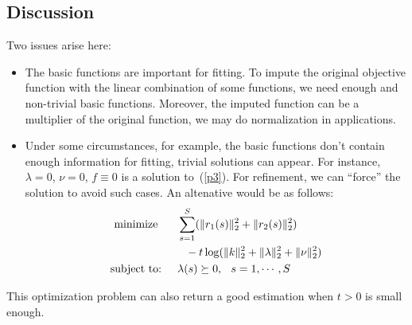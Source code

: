 \subsection{Discussion}

Two issues arise here:
\begin{itemize}
\item The basic functions are important for fitting. To impute the original objective function with the linear combination of some functions, we need enough and non-trivial basic functions. Moreover, the imputed function can be a multiplier of the original function, we may do normalization in applications.
\item Under some circumstances, for example, the basic functions don't contain enough information for fitting, trivial solutions can appear. For instance, $\lambda=0$, $\nu=0$, $f\equiv0$ is a solution to~(\ref{p3}). For refinement, we can ``force'' the solution to avoid such cases. An altenative would be as follows:
    \begin{align}
    \begin{split}\label{p4}
    \textrm{minimize }\hspace{.2in}&\sum_{s=1}^S(\|r_1(s)\|_2^2+\|r_2(s)\|_2^2)\\
    &\hspace{.1in}-t\log(\|k\|_2^2+\|\lambda\|_2^2+\|\nu\|_2^2)\\
    \textrm{subject to:}\hspace{.2in}&\lambda(s)\succeq0,\hspace{.1in}s=1,\cdots,S
    \end{split}
    \end{align}
\end{itemize}

This optimization problem can also return a good estimation when $t>0$ is small enough.

